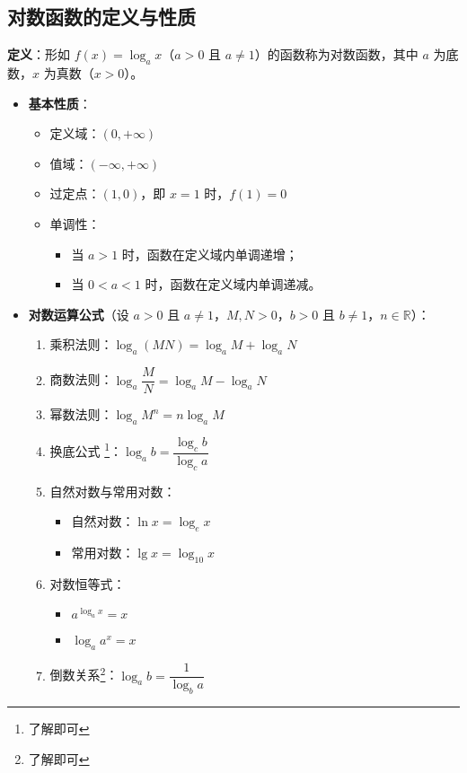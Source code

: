 \documentclass{article}
\begin{document}
\subsection{对数函数的定义与性质}
\textbf{定义}：形如 \( f(x) = \log_a x \)（\( a > 0 \) 且 \( a \neq 1 \)）的函数称为对数函数，其中 \( a \) 为底数，\( x \) 为真数（\( x > 0 \)）。

\begin{itemize}
    \item \textbf{基本性质}：
    \begin{itemize}
        \item 定义域：\( (0, +\infty) \)
        \item 值域：\( (-\infty, +\infty) \)
        \item 过定点：\( (1, 0) \)，即 \( x=1 \) 时，\( f(1) = 0 \)
        \item 单调性：
        \begin{itemize}
            \item 当 \( a > 1 \) 时，函数在定义域内单调递增；
            \item 当 \( 0 < a < 1 \) 时，函数在定义域内单调递减。
        \end{itemize}
    \end{itemize}
    
    \item \textbf{对数运算公式}（设 \( a > 0 \) 且 \( a \neq 1 \)，\( M, N > 0 \)，\( b > 0 \) 且 \( b \neq 1 \)，\( n \in \mathbb{R} \)）：
    \begin{enumerate}
        \item 乘积法则：\( \log_a(MN) = \log_a M + \log_a N \)
        \item 商数法则：\( \log_a \dfrac{M}{N} = \log_a M - \log_a N \)
        \item 幂数法则：\( \log_a M^n = n \log_a M \)
        \item 换底公式 \footnote{了解即可}：\( \log_a b = \dfrac{\log_c b}{\log_c a} \)
        \item 自然对数与常用对数：
        \begin{itemize}
            \item 自然对数：\( \ln x = \log_e x \)
            \item 常用对数：\( \lg x = \log_{10} x \)
        \end{itemize}
        \item 对数恒等式：
        \begin{itemize}
            \item \( a^{\log_a x} = x \)
            \item \( \log_a a^x = x \)
        \end{itemize}
        \item 倒数关系\footnote{了解即可}：\( \log_a b = \dfrac{1}{\log_b a} \)
    \end{enumerate}
\end{itemize}
\end{document}
